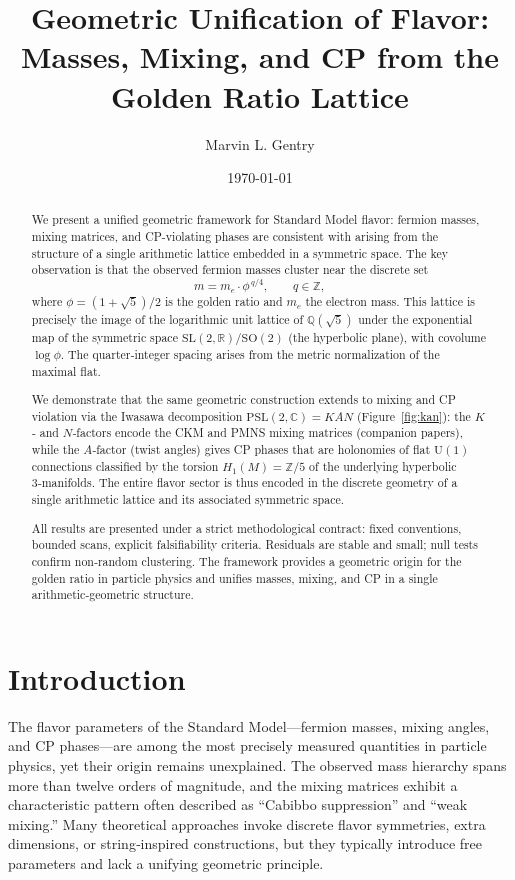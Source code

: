 \documentclass[12pt]{article}
\title{Geometric Unification of Flavor:\\ Masses, Mixing, and CP from the Golden Ratio Lattice}
\author[1]{Marvin L. Gentry}
\affil[1]{Independent Researcher, \texttt{drmlgentry@protonmail.com} \\ ORCID: 0009-0006-4550-2663}
\date{\today}
\theoremstyle{definition}
\begin{document}
\maketitle

\begin{abstract}
We present a unified geometric framework for Standard Model flavor: fermion masses, mixing matrices, and CP-violating phases are consistent with arising from the structure of a single arithmetic lattice embedded in a symmetric space. The key observation is that the observed fermion masses cluster near the discrete set
\[
m = m_e \cdot \phi^{\,q/4}, \qquad q\in\mathbb{Z},
\]
where $\phi = (1+\sqrt5)/2$ is the golden ratio and $m_e$ the electron mass. This lattice is precisely the image of the logarithmic unit lattice of $\mathbb{Q}(\sqrt5)$ under the exponential map of the symmetric space $\mathrm{SL}(2,\mathbb{R})/\mathrm{SO}(2)$ (the hyperbolic plane), with covolume $\log\phi$. The quarter‑integer spacing arises from the metric normalization of the maximal flat.

We demonstrate that the same geometric construction extends to mixing and CP violation via the Iwasawa decomposition $\mathrm{PSL}(2,\mathbb{C}) = KAN$ (Figure~\ref{fig:kan}): the $K$‑ and $N$‑factors encode the CKM and PMNS mixing matrices (companion papers), while the $A$‑factor (twist angles) gives CP phases that are holonomies of flat $\mathrm{U}(1)$ connections classified by the torsion $H_1(M)=\mathbb{Z}/5$ of the underlying hyperbolic 3‑manifolds. The entire flavor sector is thus encoded in the discrete geometry of a single arithmetic lattice and its associated symmetric space.

All results are presented under a strict methodological contract: fixed conventions, bounded scans, explicit falsifiability criteria. Residuals are stable and small; null tests confirm non‑random clustering. The framework provides a geometric origin for the golden ratio in particle physics and unifies masses, mixing, and CP in a single arithmetic‑geometric structure.
\end{abstract}

\section{Introduction}
\label{sec:intro}

The flavor parameters of the Standard Model—fermion masses, mixing angles, and CP phases—are among the most precisely measured quantities in particle physics, yet their origin remains unexplained. The observed mass hierarchy spans more than twelve orders of magnitude, and the mixing matrices exhibit a characteristic pattern often described as “Cabibbo suppression” and “weak mixing.” Many theoretical approaches invoke discrete flavor symmetries, extra dimensions, or string‑inspired constructions, but they typically introduce free parameters and lack a unifying geometric principle.
\end{document}
